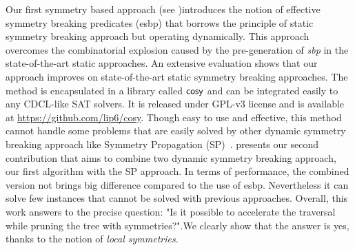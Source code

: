 %
%
Our first symmetry based approach (see )introduces the notion of effective symmetry breaking predicates (esbp) that borrows the principle of static symmetry breaking approach but operating dynamically\cite{metin2018cdclsym}.
This approach overcomes the combinatorial explosion caused by the pre-generation of \textit{sbp} in the state-of-the-art static approaches.
An extensive evaluation shows that our approach improves on state-of-the-art static 
symmetry breaking approaches.
The method is encapsulated in a library called $\textsf{cosy}$ and can be integrated easily to any
CDCL-like SAT solvers. It is released under GPL-v3 license and is available at \url{https://github.com/lip6/cosy}.
Though easy to use and effective, this method cannot handle some problems that are easily solved by other
dynamic symmetry breaking approach like Symmetry Propagation (SP)~\cite{Devriendt12}.
 presents our second contribution that aims to combine two dynamic symmetry breaking approach, our first algorithm  with the SP approach. In terms of performance, the combined version not brings big difference
compared to the use of esbp. Nevertheless it can solve few instances that cannot be solved with previous approaches.
Overall,  this  work  answers  to  the  precise  question: "Is it possible to accelerate the traversal while pruning the tree with symmetries?".We clearly show that the answer is yes, thanks to the notion of \textit{local symmetries}.

%
%
%
%
%
%
%
%
%
